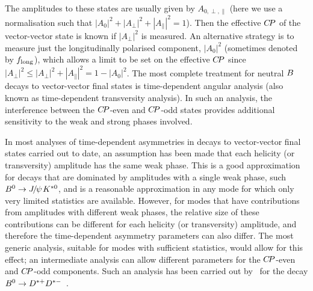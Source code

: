 The amplitudes to these states are usually given by $A_{0,\perp,\parallel}$
(here we use a normalisation such that 
$| A_0 |^2 + | A_\perp |^2 + | A_\parallel |^2 = 1$).
Then the effective $C\!P$ of the vector-vector state is known if 
$| A_\perp |^2$ is measured.
An alternative strategy is to measure just the longitudinally polarised 
component,  $| A_0 |^2$
(sometimes denoted by $f_{\rm long}$), 
which allows a limit to be set on the effective $C\!P$ since
$| A_\perp |^2 \leq | A_\perp |^2 + | A_\parallel |^2 = 1 - | A_0 |^2$.
The most complete treatment for 
neutral $B$ decays to vector-vector final states
is time-dependent angular analysis 
(also known as time-dependent transversity analysis).
In such an analysis, 
the interference between the $C\!P$-even and $C\!P$-odd states 
provides additional sensitivity to the weak and strong phases involved.

In most analyses of time-dependent \CP asymmetries in decays to 
vector-vector final states carried out to date,
an assumption has been made that each helicity (or transversity) amplitude
has the same weak phase.
This is a good approximation for decays that are dominated by 
amplitudes with a single weak phase, such $B^0 \to {J\mskip -3mu/\mskip -2mu\psi\mskip 2mu} K^{*0}$,
and is a reasonable approximation in any mode for which only 
very limited statistics are available.
However, for modes that have contributions from amplitudes with different 
weak phases, the relative size of these contributions can be different 
for each helicity (or transversity) amplitude,
and therefore the time-dependent \CP asymmetry parameters can also differ.
The most generic analysis, suitable for modes with sufficient statistics,
would allow for this effect;
an intermediate analysis can allow different parameters for the 
$C\!P$-even and $C\!P$-odd components.
Such an analysis has been carried out by \babar\ for the decay
$B^0 \to D^{*+}D^{*-}$~\cite{Aubert:2008ah}.

\label{sec:cp_uta:notations:dalitz}

